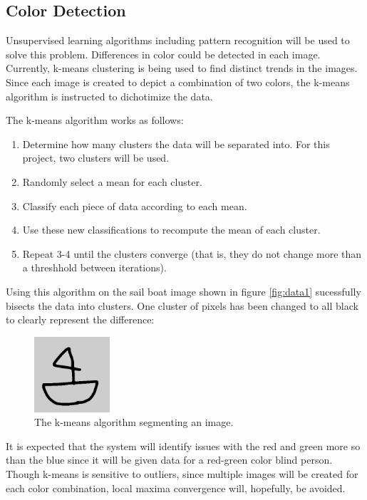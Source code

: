 \documentclass[12pt]{article}
\begin{document}
\subsection{Color Detection}
Unsupervised learning algorithms including pattern recognition will be used to solve this problem. Differences in color could be detected in each image. Currently, k-means clustering is being used to find distinct trends in the images. Since each image is created to depict a combination of two colors, the k-means algorithm is instructed to dichotimize the data.

The k-means algorithm works as follows:
\begin{enumerate}
\item Determine how many clusters the data will be separated into. For this project, two clusters will be used.
\item Randomly select a mean for each cluster.
\item Classify each piece of data according to each mean.
\item Use these new classifications to recompute the mean of each cluster.
\item Repeat 3-4 until the clusters converge (that is, they do not change more than a threshhold between iterations).
\end{enumerate}

Using this algorithm on the sail boat image shown in figure \ref{fig:data1} sucessfully bisects the data into clusters. One cluster of pixels has been changed to all black to clearly represent the difference:

\begin{figure}[H]
	\centering
	\includegraphics[width=0.25\textwidth]{img/testtest.png}
	\caption{The k-means algorithm segmenting an image.}
	\label{fig:kmeans1}
\end{figure}



It is expected that the system will identify issues with the red and green more so than the blue since it will be given data for a red-green color blind person. Though k-means is sensitive to outliers, since multiple images will be created for each color combination, local maxima convergence will, hopefully, be avoided. 
\end{document}
